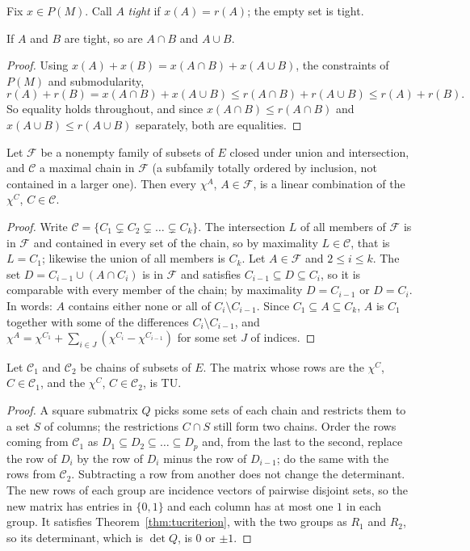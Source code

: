 Fix $x\in P(M)$. Call $A$ \emph{tight} if $x(A)=r(A)$; the empty set is tight.

\begin{lemma}[uncrossing]\label{lem:uncross}
If $A$ and $B$ are tight, so are $A\cap B$ and $A\cup B$.
\end{lemma}
\begin{proof}
Using $x(A)+x(B)=x(A\cap B)+x(A\cup B)$, the constraints of $P(M)$ and submodularity,
\[
r(A)+r(B)=x(A\cap B)+x(A\cup B)\le r(A\cap B)+r(A\cup B)\le r(A)+r(B).
\]
So equality holds throughout, and since $x(A\cap B)\le r(A\cap B)$ and $x(A\cup B)\le r(A\cup B)$ separately, both are equalities.
\end{proof}

\begin{lemma}\label{lem:chainspan}
Let $\mathcal F$ be a nonempty family of subsets of $E$ closed under union and intersection, and $\mathcal C$ a maximal chain in $\mathcal F$ (a subfamily totally ordered by inclusion, not contained in a larger one). Then
every $\chi^A$, $A\in\mathcal F$, is a linear combination of the $\chi^C$, $C\in\mathcal C$.
\end{lemma}
\begin{proof}
Write $\mathcal C=\{C_1\subsetneq C_2\subsetneq\dots\subsetneq C_k\}$. The intersection $L$ of all members of $\mathcal F$ is in $\mathcal F$ and contained in every set of the chain, so by maximality $L\in\mathcal C$, that is $L=C_1$; likewise the
union of all members is $C_k$. Let $A\in\mathcal F$ and $2\le i\le k$. The set $D=C_{i-1}\cup(A\cap C_i)$ is in $\mathcal F$ and satisfies $C_{i-1}\subseteq D\subseteq C_i$, so it is comparable with every member of the chain; by maximality
$D=C_{i-1}$ or $D=C_i$. In words: $A$ contains either none or all of $C_i\setminus C_{i-1}$. Since $C_1\subseteq A\subseteq C_k$, $A$ is $C_1$ together with some of the differences $C_i\setminus C_{i-1}$, and
$\chi^A=\chi^{C_1}+\sum_{i\in J}(\chi^{C_i}-\chi^{C_{i-1}})$ for some set $J$ of indices.
\end{proof}

\begin{lemma}\label{lem:twochains}
Let $\mathcal C_1$ and $\mathcal C_2$ be chains of subsets of $E$. The matrix whose rows are the $\chi^C$, $C\in\mathcal C_1$, and the $\chi^C$, $C\in\mathcal C_2$, is TU.
\end{lemma}
\begin{proof}
A square submatrix $Q$ picks some sets of each chain and restricts them to a set $S$ of columns; the restrictions $C\cap S$ still form two chains. Order the rows coming from $\mathcal C_1$ as $D_1\subseteq D_2\subseteq\dots\subseteq D_p$ and, from the
last to the second, replace the row of $D_i$ by the row of $D_i$ minus the row of $D_{i-1}$; do the same with the rows from $\mathcal C_2$. Subtracting a row from another does not change the determinant. The new rows of each group are
incidence vectors of pairwise disjoint sets, so the new matrix has entries in $\{0,1\}$ and each column has at most one $1$ in each group. It satisfies Theorem~\ref{thm:tucriterion}, with the two groups as $R_1$ and $R_2$,
so its determinant, which is $\det Q$, is $0$ or $\pm1$.
\end{proof}


